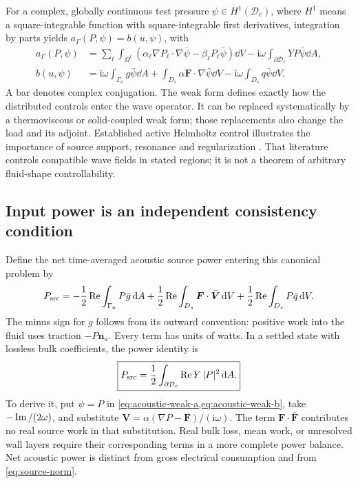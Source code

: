 For a complex, globally continuous test pressure $\psi\in H^1(\mathcal D_c)$,
where $H^1$ means a square-integrable function with square-integrable first
derivatives, integration by parts yields $a_\Gamma(P,\psi)=b(u,\psi)$, with
\begin{align}
 a_\Gamma(P,\psi)&=
  \sum_\ell\int_{\Omega^\ell}
   (\alpha_\ell\nabla P_\ell\cdot\nabla\bar\psi
                         -\beta_\ell P_\ell\bar\psi)\dd V
      -\mathrm i\omega\int_{\partial\mathcal D_c}YP\bar\psi\dd A,
      \label{eq:acoustic-weak-a}\\
 b(u,\psi)&=\mathrm i\omega\int_{\Gamma_a}g\bar\psi\dd A
       +\int_{D_s}\alpha\bm F\cdot\nabla\bar\psi\dd V
       -\mathrm i\omega\int_{D_s}q\bar\psi\dd V.
       \label{eq:acoustic-weak-b}
\end{align}
A bar denotes complex conjugation. The weak form defines exactly how the
distributed controls enter the wave operator. It can be replaced systematically
by a thermoviscous or solid-coupled weak form; those replacements also change
the load and its adjoint. Established active Helmholtz control illustrates the
importance of source support, resonance and regularization
\cite{hubenthal2016}. That literature controls compatible wave fields in stated
regions; it is not a theorem of arbitrary fluid-shape controllability.

\subsection{Input power is an independent consistency condition}
Define the net time-averaged acoustic source power entering this canonical
problem by
\begin{equation}
 P_{\rm src}=-\frac12\operatorname{Re}\int_{\Gamma_a}P\bar g\,\mathrm d A
    +\frac12\operatorname{Re}\int_{D_s}\bm F\cdot\bar{\bm V}\,\mathrm d V
    +\frac12\operatorname{Re}\int_{D_s}P\bar q\,\mathrm d V.
 \label{eq:source-power}
\end{equation}
The minus sign for $g$ follows from its outward convention: positive work into
the fluid uses traction $-P\bm n_a$. Every term has units of watts. In a settled
state with lossless bulk coefficients, the power identity is
\begin{equation}
 \boxed{P_{\rm src}=
       \frac12\int_{\partial\mathcal D_c}\operatorname{Re} Y\,|P|^2\,\mathrm d A.}
 \label{eq:power-identity}
\end{equation}
To derive it, put $\psi=P$ in \cref{eq:acoustic-weak-a,eq:acoustic-weak-b},
take $-\operatorname{Im}/(2\omega)$, and substitute
$\bm V=\alpha(\nabla P-\bm F)/(\mathrm i\omega)$.
The term $\bm F\cdot\bar{\bm F}$ contributes no real source work in that
substitution. Real bulk loss, mean work, or unresolved wall layers require
their corresponding terms in a more complete power balance. Net acoustic
power is distinct from gross electrical consumption and from
\cref{eq:source-norm}.

